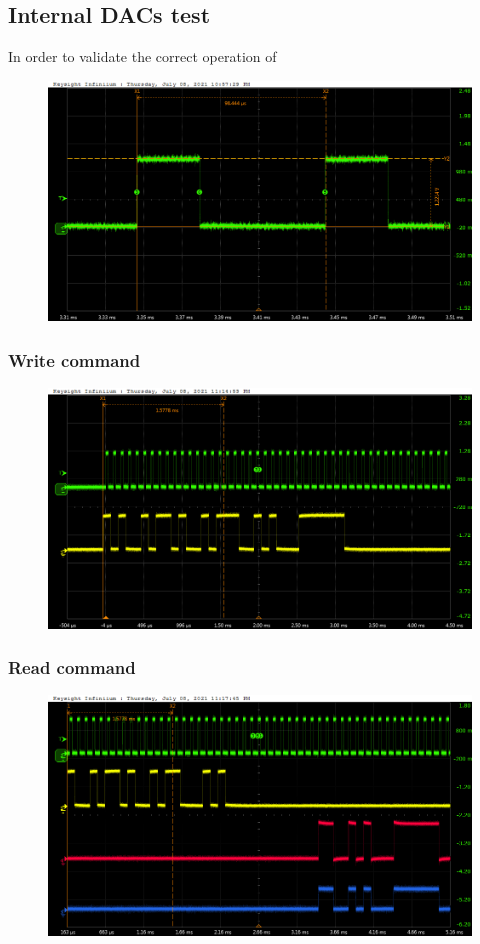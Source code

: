 \subsection{Internal DACs test}\label{dactests}
\noindent In order to validate the correct operation of
\begin{figure}[H]
	\centering
	\includegraphics[width=0.7\linewidth]{IMG/ch5/probe/09-08-2021_clock-specks}
	\caption{}
	\label{fig:clockspecs}
\end{figure}

\subsubsection{Write command}
\begin{figure}[H]
	\centering
	\includegraphics[width=0.7\linewidth]{IMG/ch5/probe/09-08-2021_ch05-write63-baselinedac1}
	\caption{}
	\label{fig:ch05write63}
\end{figure}

\subsubsection{Read command}
\begin{figure}[H]
	\centering
	\includegraphics[width=0.7\linewidth]{IMG/ch5/probe/09-08-2021_ch05-read63-baselinedac1}
	\label{fig:ch05read63}
\end{figure}


